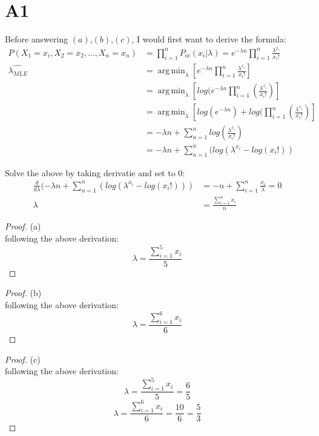 \documentclass[12pt]{article}
\DeclareMathOperator*{\argmin}{arg\,min}
\begin{document}
\section*{A1}
Before answering $(a)$,$(b)$,$(c)$, I would first want to derive the formula: \\
\[
\begin{aligned}
        P(X_1 =x_i, X_2= x_2, ...,X_n=x_n) &= \prod_{i=1}^{n}P_{oi}(x_i | \lambda) = e^{-\lambda n} \prod_{i=1}^{n} \frac{\lambda^{x_i}}{x_i!}\\
        \widehat{\lambda_{MLE}}      &= \argmin_{\lambda} [e^{-\lambda n} \prod_{i=1}^{n} \frac{\lambda^{x_i}}{x_i!}]\\
                  &=\argmin_{\lambda}  [ log (e^{-\lambda n} \prod_{i=1}^{n} (\frac{\lambda^{x_i}}{x_i!})] \\
                   &=\argmin_{\lambda}  [ log (e^{-\lambda n}) + log( \prod_{i=1}^{n} (\frac{\lambda^{x_i}}{x_i!})] \\
                   &= -\lambda n + \sum_{n=1}^{n} log(\frac{\lambda^{x_i}}{x_i !})\\
                   &= -\lambda n + \sum_{n=1}^{n} (log(\lambda^{x_i} - log(x_i !)) 
\end{aligned}
\]

Solve the above by taking derivatie and set to 0: \\
\[
\begin{aligned}
        \frac{d}{d\lambda} ( -\lambda n + \sum_{n=1}^{n} (log(\lambda^{x_i} - log(x_i !)) ) &=  -n + \sum_{i=1}^{n} \frac{x_i}{\lambda} = 0 \\ 
        \lambda &=\frac{ \sum_{i=1}^{n} x_i}{n} 
\end{aligned}
\]
\begin{proof}
        (a) \\ 
        following the above derivation: \\
        $$  \lambda =\frac{ \sum_{i=1}^{5} x_i}{5} $$ 
\end{proof}
\begin{proof}
        (b) \\ 
        following the above derivation: \\
        $$  \lambda =\frac{ \sum_{i=1}^{6} x_i}{6} $$ 
\end{proof}

\begin{proof}
        (c) \\ 
        following the above derivation: \\
        $$  \lambda =\frac{ \sum_{i=1}^{5} x_i}{5} = \frac{6}{5} $$ 
        $$  \lambda =\frac{ \sum_{i=1}^{6} x_i}{6} =\frac{10}{6}= \frac{5}{3}  $$ 
\end{proof}
\newpage
\end{document}
